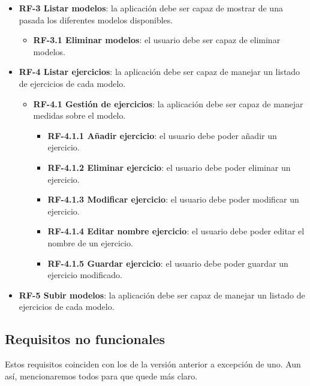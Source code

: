 \begin{itemize}
	\item \textbf{RF-3 Listar modelos}: la aplicación debe ser capaz de mostrar de una pasada los diferentes modelos disponibles.
	\begin{itemize}
		\item \textbf{RF-3.1 Eliminar modelos}: el usuario debe ser capaz de eliminar modelos.
	\end{itemize}
	\item \textbf{RF-4 Listar ejercicios}: la aplicación debe ser capaz de manejar un listado de ejercicios de cada modelo.
	\begin{itemize}
		\item \textbf{RF-4.1 Gestión de ejercicios}: la aplicación debe ser capaz de manejar medidas sobre el modelo.
		\begin{itemize}
			\item \textbf{RF-4.1.1 Añadir ejercicio}: el usuario debe poder añadir un ejercicio.
			\item \textbf{RF-4.1.2 Eliminar ejercicio}: el usuario debe poder eliminar un ejercicio.
			\item \textbf{RF-4.1.3 Modificar ejercicio}: el usuario debe poder modificar un ejercicio.
			\item \textbf{RF-4.1.4 Editar nombre ejercicio}: el usuario debe poder editar el nombre de un ejercicio.
			\item \textbf{RF-4.1.5 Guardar ejercicio}: el usuario debe poder guardar un ejercicio modificado.
		\end{itemize}
	\end{itemize}
	\item \textbf{RF-5 Subir modelos}: la aplicación debe ser capaz de manejar un listado de ejercicios de cada modelo.
\end{itemize}

\subsection{Requisitos no funcionales}
Estos requisitos coinciden con los de la versión anterior a excepción de uno. Aun así, mencionaremos todos para que quede más claro.

